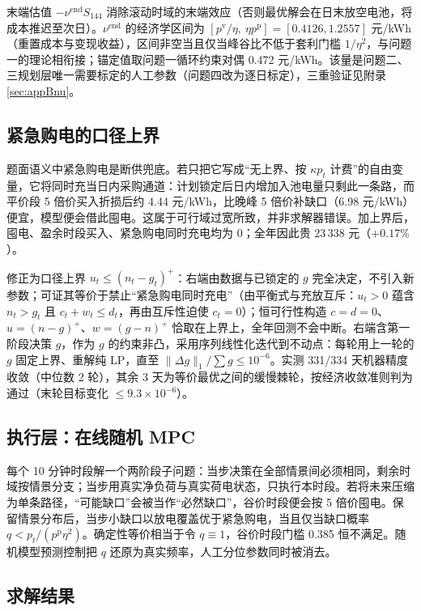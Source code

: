 \documentclass[12pt,a4paper]{ctexart}
\newcommand{\nuend}{\nu^{\mathrm{end}}}
\begin{document}
末端估值 $-\nuend S_{144}$ 消除滚动时域的末端效应（否则最优解会在日末放空电池，将成本推迟至次日）。$\nuend$ 的经济学区间为 $[p^{\mathrm v}/\eta,\ \eta p^{\mathrm p}]=[0.4126,1.2557]$ 元/kWh（重置成本与变现收益），区间非空当且仅当峰谷比不低于套利门槛 $1/\eta^2$，与问题一的理论相衔接；锚定值取问题一循环约束对偶 0.472 元/kWh。该量是问题二、三规划层唯一需要标定的人工参数（问题四改为逐日标定），三重验证见附录 \ref{sec:appBnu}。

\subsection{紧急购电的口径上界}\label{sec:q2cap}

题面语义中紧急购电是断供兜底。若只把它写成“无上界、按 $\kappa p_t$ 计费”的自由变量，它将同时充当日内采购通道：计划锁定后日内增加入池电量只剩此一条路，而平价段 5 倍价买入折损后约 4.44 元/kWh，比晚峰 5 倍价补缺口（6.98 元/kWh）便宜，模型便会借此囤电。这属于可行域过宽所致，并非求解器错误。加上界后，囤电、盈余时段买入、紧急购电同时充电均为 0；全年因此贵 23\,338 元（$+0.17\%$）。

修正为口径上界 $u_t\le(n_t-g_t)^+$：右端由数据与已锁定的 $g$ 完全决定，不引入新参数；可证其等价于禁止“紧急购电同时充电”（由平衡式与充放互斥：$u_t>0$ 蕴含 $n_t>g_t$ 且 $c_t+w_t\le d_t$，再由互斥性迫使 $c_t=0$）；恒可行性构造 $c=d=0$、$u=(n-g)^+$、$w=(g-n)^+$ 恰取在上界上，全年回测不会中断。右端含第一阶段决策 $g$，作为 $g$ 的约束非凸，采用序列线性化迭代到不动点：每轮用上一轮的 $g$ 固定上界、重解纯 LP，直至 $\|\Delta g\|_1/\sum g\le10^{-6}$。实测 331/334 天机器精度收敛（中位数 2 轮），其余 3 天为等价最优之间的缓慢棘轮，按经济收敛准则判为通过（末轮目标变化 $\le9.3\times10^{-6}$）。

\subsection{执行层：在线随机 MPC}

每个 10 分钟时段解一个两阶段子问题：当步决策在全部情景间必须相同，剩余时域按情景分支；当步用真实净负荷与真实荷电状态，只执行本时段。若将未来压缩为单条路径，“可能缺口”会被当作“必然缺口”，谷价时段便会按 5 倍价囤电。保留情景分布后，当步小缺口以放电覆盖优于紧急购电，当且仅当缺口概率 $q<p_t/(p^{\mathrm p}\eta^2)$。确定性等价相当于令 $q\equiv1$，谷价时段门槛 0.385 恒不满足。随机模型预测控制把 $q$ 还原为真实频率，人工分位参数同时被消去。

\subsection{求解结果}
\end{document}
